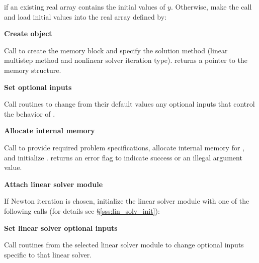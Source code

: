 \begin{Steps}
  {\s} 

  {\p} 

  if an existing real array  contains the initial values of $y$.  
  Otherwise, make the call  and load 
  initial values into the real array defined by:

  {\s} 

  {\p} 
  
\item\label{i:cvode_create} 
  {\bf Create {\cvodes} object}

  Call  
  to create the {\cvodes} memory block and specify the solution method
  (linear multistep method and nonlinear solver iteration type).
   returns a pointer to the {\cvodes} memory structure.

\item
  {\bf Set optional inputs}

  Call  routines to change from their default values any
  optional inputs that control the behavior of {\cvodes}.

\item\label{i:cvode_malloc} 
  {\bf Allocate internal memory}

  Call  
  to provide required problem specifications,
  allocate internal memory for {\cvodes}, 
  and initialize {\cvodes}.
   returns an error flag to indicate success or an illegal argument value.
  
\item\label{i:lin_solver} 
  {\bf Attach linear solver module}

  If Newton iteration is chosen, initialize the linear solver module
  with one of the following calls (for details see \S\ref{sss:lin_solv_init}):

  {\s} 

  {\s} 


  
\item
  {\bf Set linear solver optional inputs}

  Call  routines from the selected linear solver module to
  change optional inputs specific to that linear solver.


\end{Steps}
